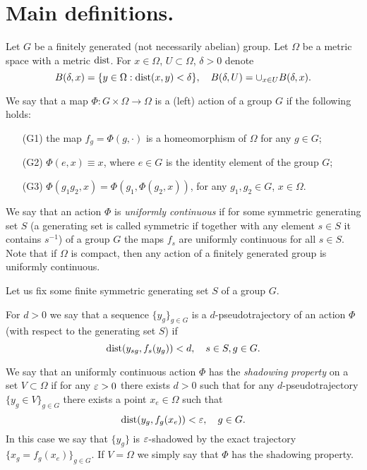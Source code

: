 \section{Main definitions.}

Let $G$ be a finitely generated (not necessarily abelian) group.
Let $\Omega$ be a metric space with a metric $\operatorname{dist}$. For $x \in \Omega$, $U \subset \Omega$, $\delta>0$ denote
$$
B(\delta, x) = \{y\in \Omega: \operatorname{dist}(x, y) < \delta\}, \quad
B(\delta, U) = \cup_{x \in U} B(\delta, x).
$$

We say that a map $\Phi: G \times \Omega \to \Omega$ is a (left) action of a group $G$ if the following holds:
\begin{itemize}
\item[(G1)] the map $f_g = \Phi(g, \cdot)$ is a homeomorphism of $\Omega$ for any $g \in G$;

\item[(G2)] $\Phi(e, x) \equiv x$, where $e \in G$ is the identity element of the group $G$;

\item[(G3)] $\Phi(g_1g_2, x) = \Phi(g_1, \Phi(g_2, x))$, for any $g_1, g_2 \in G$, $x \in \Omega$.
\end{itemize}

We say that an action $\Phi$ is \textit{uniformly continuous} if for some symmetric generating set $S$ (a generating set is called symmetric if together with any element $s \in S$ it contains $s^{-1}$) of a group $G$ the maps $f_{s}$ are uniformly continuous for all $s\in S$. Note that if $\Omega$ is compact, then any action of a finitely generated group is uniformly continuous.


Let us fix some finite symmetric generating set $S$ of a group $G$.

\begin{defin}\label{defPst}
For $d >0$ we say that a sequence $\{y_{g}\}_{g\in G}$ is a $d$-pseudo\-tra\-jec\-to\-ry of an action $\Phi$ (with respect to the generating set $S$) if
\begin{equation}
\label{dpstdef}
\operatorname{dist}(y_{sg}, f_s(y_g)) < d, \quad s \in S, g \in G.
\end{equation}
\end{defin}

\begin{defin}\label{defStSh}
We say that an uniformly continuous action $\Phi$ has the \textit{shadowing property} on a set $V \subset \Omega$ if for any $\varepsilon > 0$ there exists $d > 0$ such that for any $d$-pseudotrajectory $\{y_g \in V\}_{g\in G}$ there exists a point $x_e \in \Omega$ such that
\begin{equation}\label{eqDefSh}
\operatorname{dist}(y_g, f_g(x_e)) < \varepsilon, \quad g \in G.
\end{equation}
In this case we say that $\{y_g\}$ is $\varepsilon$-shadowed by the exact trajectory $\{x_g = f_g(x_e)\}_{g\in G}$.
If $V = \Omega$ we simply say that $\Phi$ has the shadowing property.
\end{defin}

